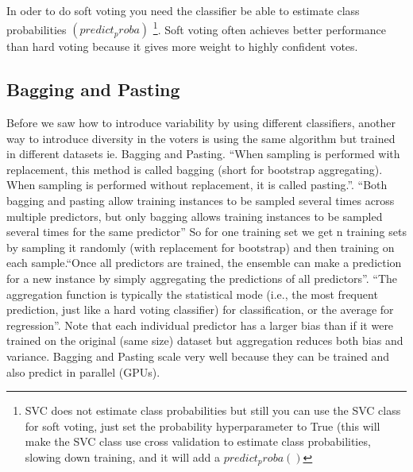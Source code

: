 \documentclass[12pt]{report}
\begin{document}
In oder to do soft voting you need the classifier be able to estimate class probabilities $(predict_proba)$ \footnote{SVC does not estimate class probabilities but still you can use the SVC class for soft voting, just set the probability hyperparameter to True (this will make the SVC class use cross validation to estimate class probabilities, slowing down training, and it will add a $predict_proba()$}. Soft voting often achieves better performance than hard voting because it gives more weight to highly confident votes.


\subsection{Bagging and Pasting}
Before we saw how to introduce variability by using different classifiers, another way to introduce diversity in the voters is using the same algorithm but trained in different datasets ie. Bagging and Pasting.
“When sampling is performed with replacement, this method is called bagging (short for bootstrap aggregating). When sampling is performed without replacement, it is called pasting.”. “Both bagging and pasting allow training instances to be sampled several times across multiple predictors, but only bagging allows training instances to be sampled several times for the same predictor”
So for one training set we get n training sets by sampling it randomly (with replacement for bootstrap) and then training on each sample.“Once all predictors are trained, the ensemble can make a prediction for a new instance by simply aggregating the predictions of all predictors”. “The aggregation function is typically the statistical mode (i.e., the most frequent prediction, just like a hard voting classifier) for classification, or the average for regression”. Note that each individual predictor has a larger bias than if it were trained on the original (same size) dataset but aggregation reduces both bias and variance.
Bagging and Pasting scale very well because they can be trained and also predict in parallel (GPUs).
\end{document}
